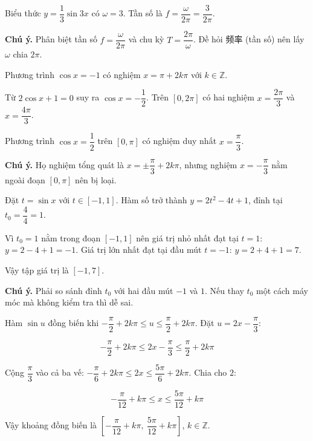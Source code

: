 \documentclass[11pt, a4paper]{article}
\begin{document}
\begin{dapan}[6 — Đáp án C]
Biểu thức $y = \dfrac{1}{3}\sin 3x$ có $\omega = 3$. Tần số là $f = \dfrac{\omega}{2\pi} = \dfrac{3}{2\pi}$.

\textbf{Chú ý.} Phân biệt tần số $f = \dfrac{\omega}{2\pi}$ và chu kỳ $T = \dfrac{2\pi}{\omega}$. Đề hỏi 频率 (tần số) nên lấy $\omega$ chia $2\pi$.
\end{dapan}

\begin{dapan}[7 — Đáp án B]
Phương trình $\cos x = -1$ có nghiệm $x = \pi + 2k\pi$ với $k \in \mathbb{Z}$.
\end{dapan}

\begin{dapan}[8 — Đáp án C]
Từ $2\cos x + 1 = 0$ suy ra $\cos x = -\dfrac{1}{2}$. Trên $[0, 2\pi]$ có hai nghiệm $x = \dfrac{2\pi}{3}$ và $x = \dfrac{4\pi}{3}$.
\end{dapan}

\begin{dapan}[9 — Đáp án C]
Phương trình $\cos x = \dfrac{1}{2}$ trên $[0, \pi]$ có nghiệm duy nhất $x = \dfrac{\pi}{3}$.

\textbf{Chú ý.} Họ nghiệm tổng quát là $x = \pm\dfrac{\pi}{3} + 2k\pi$, nhưng nghiệm $x = -\dfrac{\pi}{3}$ nằm ngoài đoạn $[0, \pi]$ nên bị loại.
\end{dapan}

\begin{dapan}[10 — Đáp án C]
Đặt $t = \sin x$ với $t \in [-1, 1]$. Hàm số trở thành $y = 2t^2 - 4t + 1$, đỉnh tại $t_0 = \dfrac{4}{4} = 1$.

Vì $t_0 = 1$ nằm trong đoạn $[-1, 1]$ nên giá trị nhỏ nhất đạt tại $t = 1$: $y = 2 - 4 + 1 = -1$. Giá trị lớn nhất đạt tại đầu mút $t = -1$: $y = 2 + 4 + 1 = 7$.

Vậy tập giá trị là $[-1, 7]$.

\textbf{Chú ý.} Phải so sánh đỉnh $t_0$ với hai đầu mút $-1$ và $1$. Nếu thay $t_0$ một cách máy móc mà không kiểm tra thì dễ sai.
\end{dapan}

\begin{dapan}[11 — Đáp án C]
Hàm $\sin u$ đồng biến khi $-\dfrac{\pi}{2} + 2k\pi \le u \le \dfrac{\pi}{2} + 2k\pi$. Đặt $u = 2x - \dfrac{\pi}{3}$:

$$-\frac{\pi}{2} + 2k\pi \le 2x - \frac{\pi}{3} \le \frac{\pi}{2} + 2k\pi$$

Cộng $\dfrac{\pi}{3}$ vào cả ba vế: $-\dfrac{\pi}{6} + 2k\pi \le 2x \le \dfrac{5\pi}{6} + 2k\pi$. Chia cho $2$:

$$-\frac{\pi}{12} + k\pi \le x \le \frac{5\pi}{12} + k\pi$$

Vậy khoảng đồng biến là $\left[-\dfrac{\pi}{12} + k\pi,\ \dfrac{5\pi}{12} + k\pi\right]$, $k \in \mathbb{Z}$.
\end{dapan}
\end{document}

